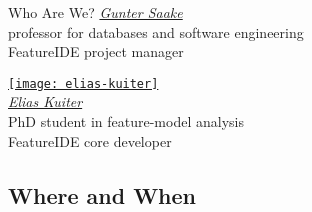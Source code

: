 \begin{frame}{\myframetitle}
\begin{mycolumns}
{\begin{note}{Who Are We?}
{					\href{https://www.dbse.ovgu.de/Mitarbeiter/Gunter+Saake.html}{\emph{Gunter Saake}}\\[.5ex]
					\small professor for databases and software engineering\\[.5ex]
					FeatureIDE project manager
				}
				\parbox{0.45\linewidth}{
					\centering
					\href{https://www.dbse.ovgu.de/Mitarbeiter/Elias+Kuiter.html}{\texttt{[image: elias-kuiter]}}\\[.5ex]
					\href{https://www.dbse.ovgu.de/Mitarbeiter/Elias+Kuiter.html}{\emph{Elias Kuiter}}\\[.5ex]
					\small PhD student in feature-model analysis\\[.5ex]
					FeatureIDE core developer
				}
			\end{note}
		}
	\end{mycolumns}
\end{frame}

\subsection{Where and When}

